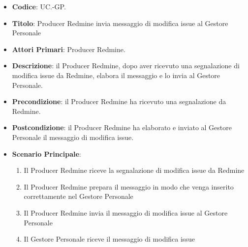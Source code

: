 		\begin{itemize}
			\item \textbf{Codice}: UC\theuccount.\thesubuccount-GP.
			\item \textbf{Titolo}: Producer Redmine invia messaggio di modifica issue al Gestore Personale
			\item \textbf{Attori Primari}: Producer Redmine.
			\item \textbf{Descrizione}: il Producer Redmine, dopo aver ricevuto una segnalazione di modifica issue da Redmine, elabora il messaggio e lo invia al Gestore Personale.
			\item \textbf{Precondizione}: il Producer Redmine ha ricevuto una segnalazione da Redmine.
			\item \textbf{Postcondizione}: il Producer Redmine ha elaborato e inviato al Gestore Personale il messaggio di modifica issue.
			\item \textbf{Scenario Principale}:
			\begin{enumerate}
				\item Il Producer Redmine riceve la segnalazione di modifica issue da Redmine
				\item Il Producer Redmine prepara il messaggio in modo che venga inserito correttamente nel Gestore Personale
				\item Il Producer Redmine invia il messaggio di	modifica issue al Gestore Personale
                \item Il Gestore Personale riceve il messaggio di modifica issue
			\end{enumerate}
		\end{itemize}

